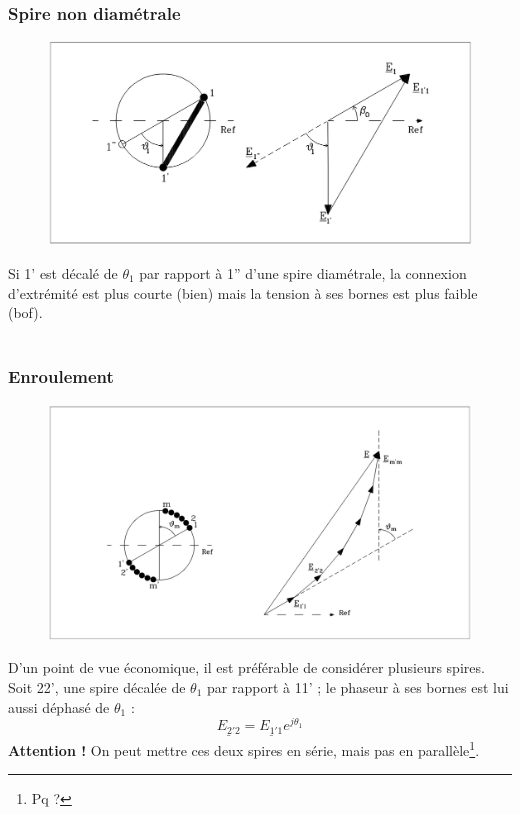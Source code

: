 		\subsubsection{Spire non diamétrale}
			\begin{figure}
			\vspace{-5mm}
			\includegraphics[scale=0.25]{ch2/image4} 
			\end{figure}
			Si 1' est décalé de $\theta_1$ par rapport à 1'' d'une spire 
			diamétrale, la connexion d'extrémité est plus courte (bien) 
			mais la tension à ses bornes est plus faible (bof).\\\\
		
		\subsubsection{Enroulement}
		\begin{figure}
			\vspace{-5mm}
			\includegraphics[scale=0.25]{ch2/image5} 
			\end{figure}
		D'un point de vue économique, il est préférable de considérer 
		plusieurs spires. Soit 22', une spire décalée de $\theta_1$ 
		par rapport à 11' ; le phaseur à ses bornes est lui aussi 
		déphasé de $\theta_1$ :
		\begin{equation}
		\underline{E_{2'2}} = \underline{E_{1'1}}e^{j\theta_1}
		\end{equation}
		\textbf{Attention !} On peut mettre ces deux spires en série, 
		mais pas en parallèle\footnote{Pq ?}.\\
		
